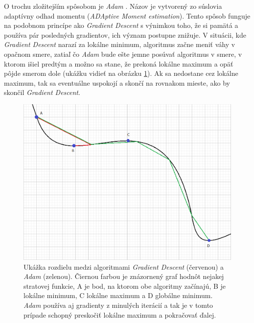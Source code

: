 O trochu zložitejším spôsobom je \textit{Adam} \citep{adam}.
Názov je vytvorený zo súslovia adaptívny odhad momentu (\textit{ADAptive Moment estimation}).
Tento spôsob funguje na podobnom princípe ako \textit{Gradient Descent} s výnimkou toho, že si pamätá a používa pár posledných gradientov, ich význam postupne znižuje.
V situácii, kde \textit{Gradient Descent} narazí za lokálne minimum, algoritmus začne meniť váhy v opačnom smere, zatiaľ čo \textit{Adam} bude ešte jemne posúvať algoritmus v smere, v ktorom išiel predtým a možno sa stane, že prekoná lokálne maximum a opäť pôjde smerom dole (ukážku vidieť na obrázku \ref{adam}). Ak sa nedostane cez lokálne maximum, tak sa eventuálne uspokojí a skončí na rovnakom mieste, ako by skončil \textit{Gradient Descent}.
\noindent
\begin{figure}  [h!]
\includegraphics[width=\textwidth]{../img/gd_adam.png}
\caption{Ukážka rozdielu medzi algoritmami \textit{Gradient Descent} (červenou) a \textit{Adam} (zelenou). Čiernou farbou je znázornený graf hodnôt nejakej stratovej funkcie, A je bod, na ktorom obe algoritmy začínajú, B je lokálne minimum, C lokálne maximum a D globálne minimum. \textit{Adam} používa aj gradienty z minulých iterácií a tak je v tomto prípade schopný preskočiť lokálne maximum a pokračovať ďalej.}
\label{adam}
\end{figure}

